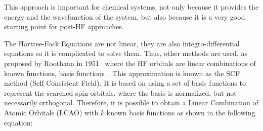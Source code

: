 %
%

This approach is important for chemical systems,
not only because it provides the energy and the wavefunction of the system,
but also because it is a very good starting point for post-HF approaches.

The Hartree-Fock Equations are not linear, they are also integro-differential
equations so it is complicated to solve them.  Thus, other methods are used, as
proposed by Roothaan in 1951~\cite{Roothaan1951} where the HF orbitals are
linear combinations of known functions, basis functions~\cite{levine}. This
approximation is known as the \gls{SCF} method (Self Consistent Field). It is
based on using a set of basis functions to represent the searched spin-orbitals,
where the basis is normalized, but not necessarily orthogonal. Therefore, it is
possible to obtain a Linear Combination of Atomic Orbitals (\gls{LCAO}) with $k$
known basis functions as shown in the following equation:

